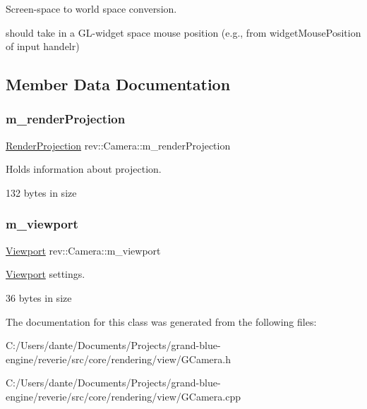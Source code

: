 Screen-\/space to world space conversion. 

should take in a G\+L-\/widget space mouse position (e.\+g., from widget\+Mouse\+Position of input handelr) 

\subsection{Member Data Documentation}
\mbox{\label{classrev_1_1_camera_ac0ef896bd514bc8659ab7f18183492f5}} 
\subsubsection{\texorpdfstring{m\_renderProjection}{m\_renderProjection}}
{\footnotesize\ttfamily \mbox{\hyperlink{classrev_1_1_render_projection}{Render\+Projection}} rev\+::\+Camera\+::m\+\_\+render\+Projection\hspace{0.3cm}{\ttfamily [protected]}}



Holds information about projection. 

132 bytes in size \mbox{\label{classrev_1_1_camera_abfe972729c47b714bd17bb8495440510}} 
\subsubsection{\texorpdfstring{m\_viewport}{m\_viewport}}
{\footnotesize\ttfamily \mbox{\hyperlink{classrev_1_1_viewport}{Viewport}} rev\+::\+Camera\+::m\+\_\+viewport\hspace{0.3cm}{\ttfamily [protected]}}



\mbox{\hyperlink{classrev_1_1_viewport}{Viewport}} settings. 

36 bytes in size 

The documentation for this class was generated from the following files\+:\begin{DoxyCompactItemize}
\item 
C\+:/\+Users/dante/\+Documents/\+Projects/grand-\/blue-\/engine/reverie/src/core/rendering/view/G\+Camera.\+h\item 
C\+:/\+Users/dante/\+Documents/\+Projects/grand-\/blue-\/engine/reverie/src/core/rendering/view/G\+Camera.\+cpp\end{DoxyCompactItemize}
